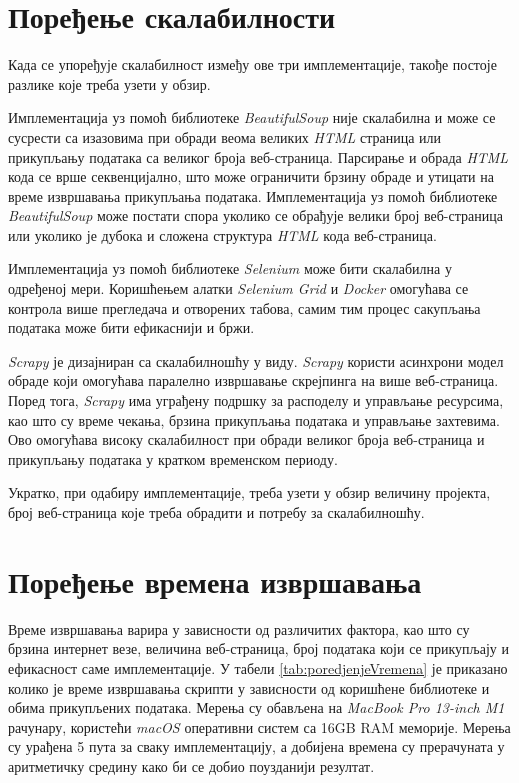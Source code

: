 \documentclass[12pt,oneside]{memoir}
\begin{document}
\section{Поређење скалабилности}
Када се упоређује скалабилност између ове три имплементације, такође постоје разлике које треба узети у обзир. 

Имплементација уз помоћ библиотеке \textit{BeautifulSoup} није скалабилна и може се сусрести са изазовима при обради веома великих \textit{HTML} страница или прикупљању података са великог броја веб-страница. Парсирање и обрада \textit{HTML} кода се врше секвенцијално, што може ограничити брзину обраде и утицати на време извршавања прикупљања података. Имплементација уз помоћ библиотеке 
\textit{BeautifulSoup} може постати спора уколико се обрађује велики број веб-страница или уколико је дубока и сложена структура \textit{HTML} кода веб-страница.

Имплементација уз помоћ библиотеке \textit{Selenium} може бити скалабилна у одређеној мери. Коришћењем алатки \textit{Selenium Grid}\cite{selenium} и \textit{Docker}\cite{docker} омогућава се контрола више прегледача и отворених табова, самим тим процес сакупљања података може бити ефикаснији и бржи.

\textit{Scrapy} је дизајниран са скалабилношћу у виду.
\textit{Scrapy} користи асинхрони модел обраде који омогућава паралелно извршавање скрејпинга на више веб-страница. Поред тога, \textit{Scrapy} има уграђену подршку за расподелу и управљање ресурсима, као што су време чекања, брзина прикупљања података и управљање захтевима. Ово омогућава високу скалабилност при обради великог броја веб-страница и прикупљању података у кратком временском периоду.

Укратко, при одабиру имплементације, треба узети у обзир
величину пројекта, број веб-страница које треба обрадити и потребу за скалабилношћу.

\section{Поређење времена извршавања}
Време извршавања варира у зависности од различитих фактора, као што су брзина интернет везе, величина веб-страница, број података који се прикупљају и ефикасност саме имплементације. У табели \ref{tab:poredjenjeVremena} је приказано колико је време извршавања скрипти у зависности од коришћене библиотеке и обима прикупљених података. Мерења су обављена на \textit{MacBook Pro 13-inch M1} рачунару, користећи \textit{macOS} оперативни систем са 16GB RAM меморије. Мерења су урађена 5 пута за сваку имплементацију, а добијена времена су прерачуната у аритметичку средину како би се добио поузданији резултат.
\end{document}
